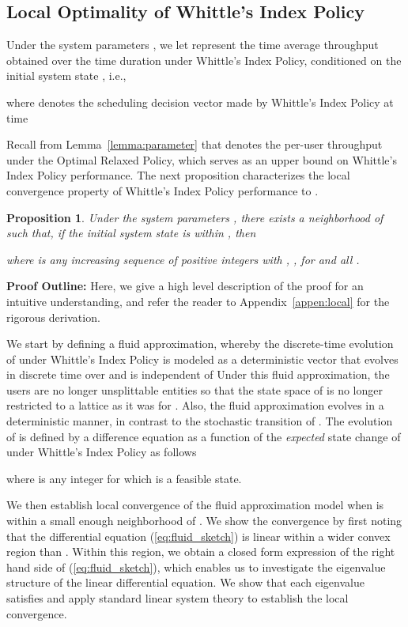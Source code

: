 \documentclass[11pt,twocolumn]{IEEEtran}
\newtheorem{proposition}{Proposition}
\begin{document}
\subsection{Local Optimality of Whittle's Index Policy}
Under the system parameters , we let
 represent the time average
throughput obtained over the time duration 
under Whittle's Index Policy, conditioned on the initial system
state , i.e.,

where  denotes the scheduling decision vector made
by Whittle's Index Policy at time 

Recall from Lemma~\ref{lemma:parameter} that 
denotes the per-user throughput under the Optimal Relaxed Policy,
which serves as an upper bound on Whittle's Index Policy
performance. The next proposition characterizes the local
convergence property of Whittle's Index Policy performance to .

\begin{proposition}
\label{prop:local_conv} Under the system parameters , there exists a  neighborhood
 of
 such that, if the initial
system state  is within  , then

where  is any increasing sequence of positive integers
with , , for  and
all .
\end{proposition}



\noindent \textbf{Proof Outline:} Here, we give a high level
description of the proof for an intuitive understanding, and refer the reader to
Appendix~\ref{appen:local} for the rigorous
derivation. \vspace{1pt}

 We start by defining a fluid approximation, whereby the
discrete-time evolution of  under Whittle's Index
Policy is modeled as a deterministic vector  that evolves {in discrete time} over  and is independent of  Under this fluid approximation, the users are no longer
unsplittable entities so that the state space of  is no
longer restricted to a lattice as it was for . Also,
the fluid approximation  evolves in a deterministic
manner, in contrast to the stochastic transition of .
The evolution of  is defined by a {difference} equation
as a function of the \emph{expected} state change of  under Whittle's Index Policy as follows

where  is any integer for which  is a feasible state.


 We then establish local convergence of the fluid
approximation model when  is within a small enough
 neighborhood  of . We show the
convergence by first noting that the differential equation
(\ref{eq:fluid_sketch}) is linear within a wider convex region than
. Within
this region, we obtain a closed form expression of the right hand
side of (\ref{eq:fluid_sketch}), which enables us to investigate the
eigenvalue structure of the linear differential equation. We show
{that each eigenvalue  satisfies } and apply standard linear
system theory to establish the local convergence.
\end{document}
